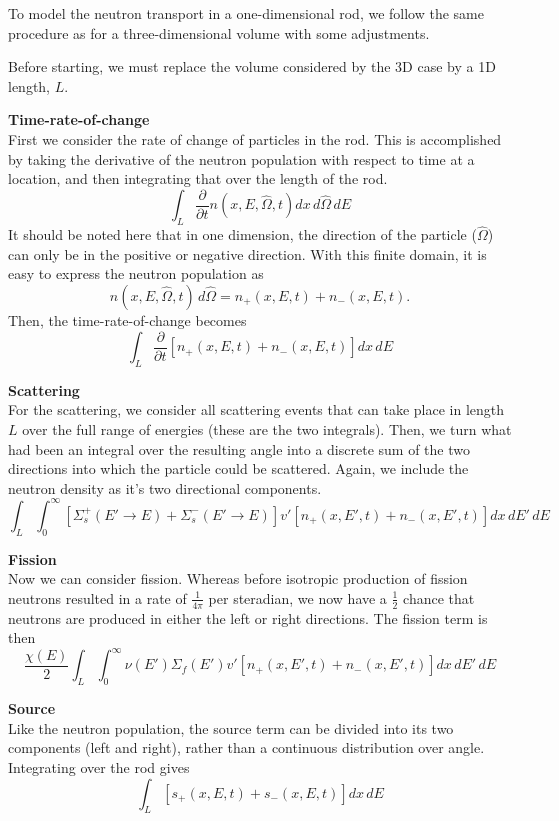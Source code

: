 \documentclass{article}
\begin{document}
To model the neutron transport in a one-dimensional rod, we follow the same procedure as for a three-dimensional volume with some adjustments.

Before starting, we must replace the volume considered by the 3D case by a 1D length, $L$. 

\textbf{Time-rate-of-change}\\
First we consider the rate of change of particles in the rod. This is accomplished by taking the derivative of the neutron population with respect to time at a location, and then integrating that over the length of the rod.
$$ \int_L \frac{\partial}{\partial t}n(x,E,\hat{\Omega},t)dx\,d\hat{\Omega}\,dE $$
It should be noted here that in one dimension, the direction of the particle ($\hat{\Omega}$) can only be in the positive or negative direction. With this finite domain, it is easy to express the neutron population as
$$ n(x,E,\hat{\Omega},t)\,d\hat{\Omega} = n_{+}(x,E,t) + n_{-}(x,E,t). $$
Then, the time-rate-of-change becomes
$$ \int_L \frac{\partial}{\partial t}\left[n_{+}(x,E,t) + n_{-}(x,E,t)\right]dx\,dE $$

\textbf{Scattering}\\
For the scattering, we consider all scattering events that can take place in length $L$ over the full range of energies (these are the two integrals). Then, we turn what had been an integral over the resulting angle into a discrete sum of the two directions into which the particle could be scattered. Again, we include the neutron density as it's two directional components.
$$ \int_L \int_0^{\infty} \left[\Sigma_s^{+}(E'\rightarrow E) + \Sigma_s^{-}(E'\rightarrow E)\right] v' \left[n_{+}(x,E',t) + n_{-}(x,E',t)\right]dx\,dE'\,dE$$

\textbf{Fission}\\
Now we can consider fission. Whereas before isotropic production of fission neutrons resulted in a rate of $\frac{1}{4\pi}$ per steradian, we now have a $\frac{1}{2}$ chance that neutrons are produced in either the left or right directions. The fission term is then
$$ \frac{\chi(E)}{2} \int_L \int_0^{\infty} \nu(E') \Sigma_f(E') v' \left[n_{+}(x,E',t) + n_{-}(x,E',t)\right]dx\,dE'\,dE $$

\textbf{Source}\\
Like the neutron population, the source term can be divided into its two components (left and right), rather than a continuous distribution over angle. Integrating over the rod gives
$$ \int_L \left[s_{+}(x,E,t) + s_{-}(x,E,t)\right]dx\,dE $$
\end{document}
